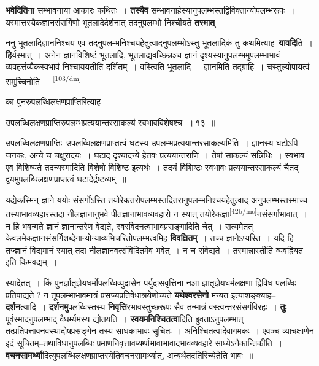 \documentclass[article,12pt,a4paper]{memoir}
\begin{document}
	  \pstart \textbf{भवेदिति}ना सम्भावनाया आकारः कथितः । \textbf{तस्यैव} सम्भावनार्हस्यानुपलम्भस्तद्विविक्तान्योपलम्भरूपः । यस्मात्तस्यैकज्ञानसंसर्गिणो भूतलादेर्दर्शनात् तदनुपलम्भो निश्चीयते \textbf{तस्मात्} ।
	\pend
      

	  \pstart ननु भूतलादिज्ञाननिश्चय एव तदनुपलम्भनिश्चयहेतुत्वादनुपलम्भोऽस्तु भूतलादिकं तु कथमित्याह--\textbf{यावदि}ति । \textbf{हि}र्यस्मात् । अनेन ज्ञानविशिष्टं भूतलादि, भूतलाद्यवच्छिन्नञ्च ज्ञानं दृश्यस्यानुपलम्भमुपलम्भाभावं व्यवहर्त्तव्यैकस्वभावं निश्चाययतीति दर्शितम् । वस्त्विति भूतलादि । ज्ञानमिति तद्ग्राहि । चस्तुल्योपायत्वं समुच्चिनोति ।
	\pend
      \leavevmode\textsuperscript{\rmlatinfont\tiny [103/dm]}

	  \pstart का पुनरुपलब्धिलक्षणप्राप्तिरित्याह--
	\pend
       

	  \pstart उपलब्धिलक्षणप्राप्तिरुपलम्भप्रत्ययान्तरसाकल्यं स्वभावविशेषश्च ॥ १३ ॥
	\pend
       

	  \pstart उपलब्धिलक्षणप्राप्तिः--उपलब्धिलक्षणप्राप्तत्वं घटस्य उपलम्भप्रत्ययान्तरसाकल्यमिति । ज्ञानस्य घटोऽपि जनकः, अन्ये च चक्षुरादयः । घटाद् दृश्यादन्ये हेतवः प्रत्ययान्तराणि । तेषां साकल्यं सन्निधिः । स्वभाव एव विशिष्यते तदन्यस्मादिति विशेषो विशिष्ट इत्यर्थः । तदयं विशिष्टः स्वभावः प्रत्ययान्तरसाकल्यं चैतद् द्वयमुपलब्धिलक्षणप्राप्तत्वं घटादेर्द्रष्टव्यम् ॥
	\pend
      

	  \pstart यद्येकस्मिन् ज्ञाने ययोः संसर्गोऽस्ति तयोरेकतरोपलम्भस्तदितरानुपलम्भनिश्चयहेतुत्वाद् अनुपलम्भस्तस्माच्च तस्याभावव्यहारस्तदा नीलज्ञानानुभवे पीतज्ञानाभावव्यवहारो न स्यात् तयोरेकज्ञा\leavevmode\textsuperscript{\rmlatinfont\tiny [42b/ms]}नसंसर्गाभावात् । न हि भवन्मते ज्ञानं ज्ञानान्तरेण वेद्यते, स्वसंवेदनत्वाभावप्रसङ्गादिति चेत् । सत्यमेतत् । केवलमेकज्ञानसंसर्गिशब्देनान्योन्याव्यभिचरितोपलम्भत्वमिह \textbf{विवक्षितम्} । तच्च ज्ञानेऽप्यस्ति । यदि हि तज्ज्ञानं विद्यमानं स्यात् तदा नीलज्ञानवत्संविदितमेव भवेत् । न च संवेद्यते । तस्मान्नास्तीति व्यवह्रियत इति किमवद्यम् ।
	\pend
      

	  \pstart स्यादेतत् । किं पुनर्ज्ञातृज्ञेयधर्मोपलब्धिव्युदासेन पर्युदासवृत्तिना नञा ज्ञातृज्ञेयधर्मलक्षणा द्विविध पलब्धिः प्रतिपाद्यते ? न तूपलम्भाभावमात्रं प्रसज्यप्रतिषेधाश्रयेणोच्यते \textbf{यथेश्वरसेनो} मन्यत इत्याशङ्क्याह--\textbf{दर्शन}त्यादि । \textbf{दर्शनमु}पलब्धिस्तस्य \textbf{निवृत्ति}रभावस्तुच्छरूपः सैव तन्मात्रं वस्त्वन्तरसंसर्गविरहः । \textbf{तुः} पूर्वस्मादनुपलम्भाद् वैधर्म्यमस्य द्योतयति । \textbf{स्वयमनिश्चितत्वा}दिति ब्रुवताऽनुपलम्भात् तत्प्रतिपत्तावनवस्थादोषप्रसङ्गेन तस्य साधकाभावः सूचितः । अनिश्चितत्वादेवागमकः । एवञ्च व्याचक्षाणेन इदं सूचितम्--तथाविधानुपलब्धिः प्रमाणनिवृत्तावप्यर्थाभावाभावादभावव्यवहारे साध्येऽनैकान्तिकीति । \textbf{वचनसामर्थ्या}दित्युपलब्धिलक्षणप्राप्तस्येतिवचनसामर्थ्यात्, अन्यथैतदतिरिच्येतेति भावः ॥
	\pend
      
\end{document}
